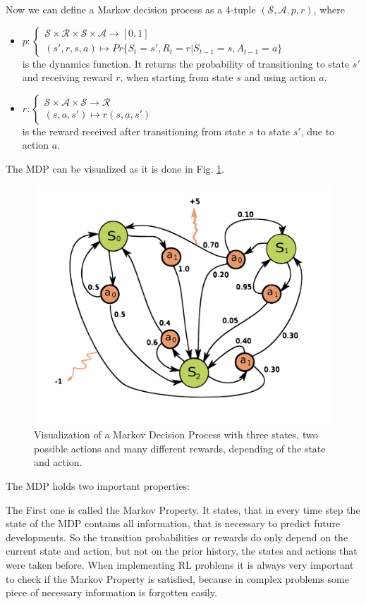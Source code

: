 \documentclass[paper=a4, fontsize=11pt]{scrartcl} %
\numberwithin{equation}{section} %
\numberwithin{figure}{section} %
\numberwithin{table}{section} %
\begin{document}
	Now we can define a Markov decision process as a $4$-tuple $(\mathcal{S}, \mathcal{A}, p, r)$, where
\begin{itemize}
\item $p: \begin{cases}\mathcal{S} \times \mathcal{R} \times \mathcal{S} \times \mathcal{A} \rightarrow [0,1] \\ (s',r ,s,a ) \mapsto Pr\{S_t = s', R_t = r| S_{t-1} = s, A_{t-1} = a\}  \end{cases} $ \\ is the dynamics function. It returns the probability of transitioning to state $s'$ and receiving reward $r$, when starting from state $s$ and using action $a$. \\
\item $r: \begin{cases} \mathcal{S} \times \mathcal{A} \times \mathcal{S} \rightarrow \mathcal{R} \\ (s, a, s') \mapsto r(s, a, s') \end{cases}$ \\ is the reward received after transitioning from state $s$ to state $s'$, due to action $a$.\\
\end{itemize}

	The MDP can be visualized as it is done in Fig. \ref{fig:MDP}.

\begin{figure}[H]
\centering
\includegraphics[width=0.6\linewidth]{Images/Markov_Decision_Process.pdf}
\caption{\cite{WikiMarkov} Visualization of a Markov Decision Process with three states, two possible actions and many different rewards, depending of the state and action.}
\label{fig:MDP}
\end{figure}

	The MDP holds two important properties: 

	The First one is called the Markov Property. It states, that in every time step the state of the MDP contains all information, that is necessary to predict future developments. So the transition probabilities or rewards do only depend on the current state and action, but not on the prior history, the states and actions that were taken before. When implementing RL problems it is always very important to check if the Markov Property is satisfied, because in complex problems some piece of necessary information is forgotten easily. 
\end{document}

